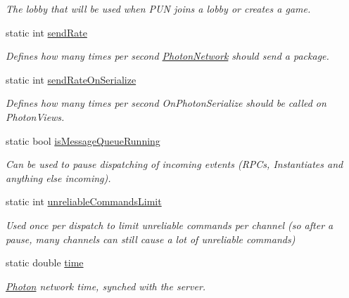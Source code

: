 \begin{DoxyCompactItemize}
\begin{DoxyCompactList}\small\item\em The lobby that will be used when P\+UN joins a lobby or creates a game. \end{DoxyCompactList}\item 
static int \hyperlink{class_photon_network_a154fc601fac7f0fddd704231189457fb}{send\+Rate}
\begin{DoxyCompactList}\small\item\em Defines how many times per second \hyperlink{class_photon_network}{Photon\+Network} should send a package. \end{DoxyCompactList}\item 
static int \hyperlink{class_photon_network_ac23d14ad150a87d51f4ffaa286db29e1}{send\+Rate\+On\+Serialize}
\begin{DoxyCompactList}\small\item\em Defines how many times per second On\+Photon\+Serialize should be called on Photon\+Views. \end{DoxyCompactList}\item 
static bool \hyperlink{class_photon_network_a9cf8214080471001a1a32e17eff9b402}{is\+Message\+Queue\+Running}
\begin{DoxyCompactList}\small\item\em Can be used to pause dispatching of incoming evtents (R\+P\+Cs, Instantiates and anything else incoming). \end{DoxyCompactList}\item 
static int \hyperlink{class_photon_network_a3315be88f62dbdc24819946fc6171e08}{unreliable\+Commands\+Limit}
\begin{DoxyCompactList}\small\item\em Used once per dispatch to limit unreliable commands per channel (so after a pause, many channels can still cause a lot of unreliable commands) \end{DoxyCompactList}\item 
static double \hyperlink{class_photon_network_a86ab96957666ef72830a35662ef3d30b}{time}
\begin{DoxyCompactList}\small\item\em \hyperlink{namespace_photon}{Photon} network time, synched with the server. \end{DoxyCompactList}\item 

\end{DoxyCompactItemize}
